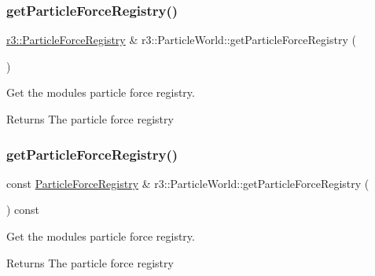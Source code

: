 \subsubsection{\texorpdfstring{get\+Particle\+Force\+Registry()}{getParticleForceRegistry()}\hspace{0.1cm}{\footnotesize\ttfamily [1/2]}}
{\footnotesize\ttfamily \mbox{\hyperlink{classr3_1_1_particle_force_registry}{r3\+::\+Particle\+Force\+Registry}} \& r3\+::\+Particle\+World\+::get\+Particle\+Force\+Registry (\begin{DoxyParamCaption}{ }\end{DoxyParamCaption})}



Get the module\textquotesingle{}s particle force registry. 

\begin{DoxyReturn}{Returns}
The particle force registry 
\end{DoxyReturn}
\mbox{\label{classr3_1_1_particle_world_add0e006264e25065ff226eafc0c1a29d}} 
\subsubsection{\texorpdfstring{get\+Particle\+Force\+Registry()}{getParticleForceRegistry()}\hspace{0.1cm}{\footnotesize\ttfamily [2/2]}}
{\footnotesize\ttfamily const \mbox{\hyperlink{classr3_1_1_particle_force_registry}{Particle\+Force\+Registry}} \& r3\+::\+Particle\+World\+::get\+Particle\+Force\+Registry (\begin{DoxyParamCaption}{ }\end{DoxyParamCaption}) const}



Get the module\textquotesingle{}s particle force registry. 

\begin{DoxyReturn}{Returns}
The particle force registry 
\end{DoxyReturn}
\mbox{\label{classr3_1_1_particle_world_a00a5014002f28e35ebb59a3f8175db3c}} 
